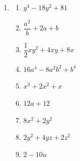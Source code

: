 \begin{enumerate}
    \item
          \begin{enumerate}
              \item \(y^4-18y^2+81\)
              \item \(\dfrac{a^2}{b}+2a+b\)
              \item \(\dfrac{1}{2}xy^2+4xy+8x\)
              \item \(16a^4-8a^2b^2+b^4\)
              \item \(x^3+2x^2+x\)
              \item \(12a+12\)
              \item \(8x^2+2y^2\)
              \item \(2y^2+4yz+2z^2\)
              \item \(2-10u\)
          \end{enumerate}
\end{enumerate}






















